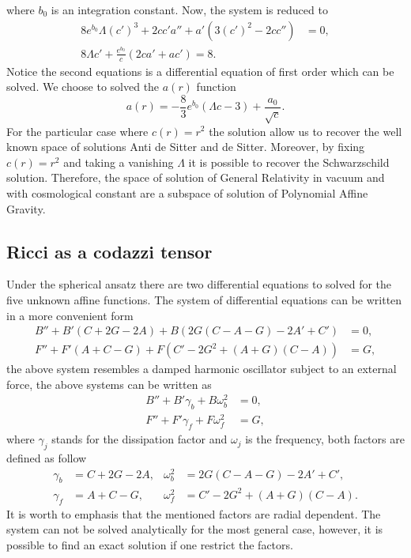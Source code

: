 \documentclass{article}
\begin{document}
where $b_0$ is an integration constant. Now, the system is reduced to 
\begin{align}
    8e^{b_0}\Lambda (c')^3 + 2cc'a'' + a'\left(3(c')^2 -2cc''\right) & = 0, \\
    8\Lambda c' + \frac{e^{b_0}}{c}\left(2ca' + ac'\right) = 8.
\end{align}
Notice the second equations is a differential equation of first order which
can be solved. We choose to solved the $a(r)$ function
\begin{equation}
    a(r) = -\frac{8}{3}e^{b_0}\left(\Lambda c - 3\right) + \frac{a_0}{\sqrt{c}}.
\end{equation}
For the particular case where $c(r) = r^2$ the solution allow us to recover the
well known space of solutions Anti de Sitter and de Sitter. Moreover, by fixing
$c(r) = r^2$ and taking a vanishing $\Lambda$ it is possible to recover the
Schwarzschild solution. Therefore, the space of solution of General Relativity
in vacuum and with cosmological constant are a subspace of solution of Polynomial
Affine Gravity.


\subsection{Ricci as a codazzi tensor}

Under the spherical ansatz there are two differential equations to solved
for the five unknown affine functions. The system of differential equations
can be written in a more convenient form
\begin{align}
    B'' + B'\left(C + 2G - 2A\right) + B\left(2G\left(C - A - G\right) - 2A' + C'\right) & = 0, \\
    F'' + F'\left(A + C - G\right) + F\left(C' - 2G^2 + \left(A + G\right)\left(C - A\right)\right) & = G,
\end{align}
the above system resembles a damped harmonic oscillator subject to an external force,
the above systems can be written as 
\begin{align}
    B'' + B'\gamma_b + B\omega^2_b & = 0, \label{eq_B}\\
    F'' + F'\gamma_f + F\omega^2_f & = G, \label{eq_F}
\end{align}
where $\gamma_j$ stands for the dissipation factor and $\omega_j$ is the frequency,
both factors are defined as follow
\begin{align}
    \gamma_b & = C + 2G - 2A, & \omega^2_b & = 2G\left(C - A - G\right) - 2A' + C', \\
    \gamma_f & = A + C - G, & \omega^2_f & = C' - 2G^2 + \left(A + G\right)\left(C - A\right).
\end{align}
It is worth to emphasis that the mentioned factors are radial dependent. The system can not
be solved analytically for the most general case, however, it is possible to find an exact
solution if one restrict the factors.
\end{document}
